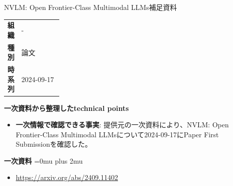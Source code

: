 \begin{technicalnote}{NVLM: Open Frontier-Class Multimodal LLMs}{補足資料}
\begingroup
\begin{tabularx}{\linewidth}{@{}>{\bfseries}p{0.22\linewidth}X@{}}
組織 & - \\
種別 & 論文 \\
時系列 & 2024-09-17 \\
\end{tabularx}
\smallskip
{\bfseries 一次資料から整理したtechnical points}
\begin{itemize}[leftmargin=1.5em,itemsep=0.35em]
\item \textbf{一次情報で確認できる事実}: 提供元の一次資料により、NVLM: Open Frontier-Class Multimodal LLMsについて2024-09-17にPaper First Submissionを確認した。
\end{itemize}
\begin{minipage}{\linewidth}
\begin{samepage}
{\bfseries 一次資料}
\begingroup\sloppy
\Urlmuskip=0mu plus 2mu\relax
\begin{itemize}[leftmargin=1.5em,itemsep=0.25em]
\item {\scriptsize\url{https://arxiv.org/abs/2409.11402}}
\end{itemize}
\endgroup
\end{samepage}
\end{minipage}
\endgroup
\end{technicalnote}
\medskip

